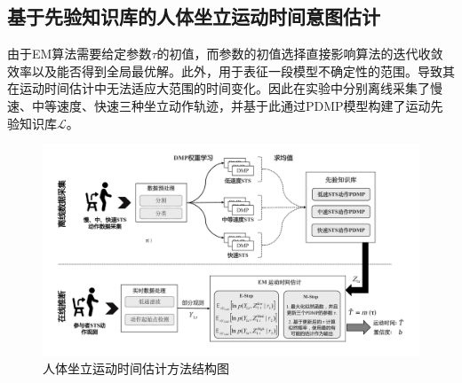 \subsection{基于先验知识库的人体坐立运动时间意图估计}
由于EM算法需要给定参数$\tau$的初值，而参数的初值选择直接影响算法的迭代收敛效率以及能否得到全局最优解。此外，用于表征一段模型不确定性的范围。导致其在运动时间估计中无法适应大范围的时间变化。因此在实验中分别离线采集了慢速、中等速度、快速三种坐立动作轨迹，并基于此通过PDMP模型构建了运动先验知识库$\mathscr{L}$。

\begin{figure}[htb]
    \centering\includegraphics[width=1\textwidth]{figures/4-Fig-3.pdf}
    \caption{人体坐立运动时间估计方法结构图}
    \label{fig:4-3}
\end{figure}

